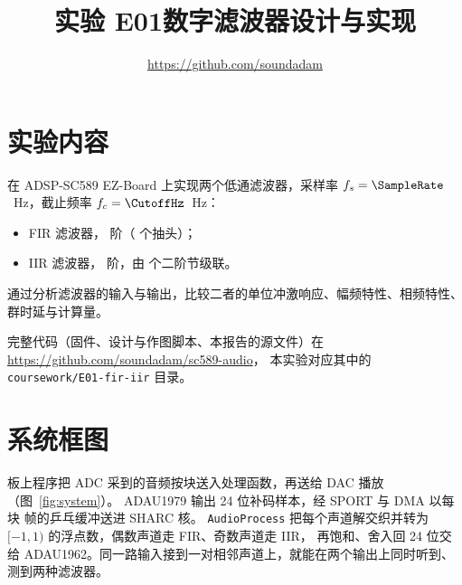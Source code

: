 \documentclass[zihao=-4, linespread=1.5, fontset=none]{ctexart}
\title{实验 E01\quad 数字滤波器设计与实现}
\author{\ReportAuthor\quad\url{https://github.com/soundadam}}
\date{}
\begin{document}
\maketitle

\section{实验内容}

在 ADSP-SC589 EZ-Board 上实现两个低通滤波器，采样率 $f_s=\SampleRate$~Hz，截止频率 $f_c=\CutoffHz$~Hz：
\begin{itemize}
  \item FIR 滤波器，\FirOrder{} 阶（\FirTaps{} 个抽头）；
  \item IIR 滤波器，\IirOrder{} 阶，由 \IirSections{} 个二阶节级联。
\end{itemize}
通过分析滤波器的输入与输出，比较二者的单位冲激响应、幅频特性、相频特性、群时延与计算量。

完整代码（固件、设计与作图脚本、本报告的源文件）在 \url{https://github.com/soundadam/sc589-audio}，
本实验对应其中的 \texttt{coursework/E01-fir-iir} 目录。

\section{系统框图}

板上程序把 ADC 采到的音频按块送入处理函数，再送给 DAC 播放（图~\ref{fig:system}）。
ADAU1979 输出 24 位补码样本，经 SPORT 与 DMA 以每块 \BlockFrames{} 帧的乒乓缓冲送进 SHARC 核。
\texttt{AudioProcess} 把每个声道解交织并转为 $[-1,1)$ 的浮点数，偶数声道走 FIR、奇数声道走 IIR，
再饱和、舍入回 24 位交给 ADAU1962。同一路输入接到一对相邻声道上，就能在两个输出上同时听到、测到两种滤波器。
\end{document}
